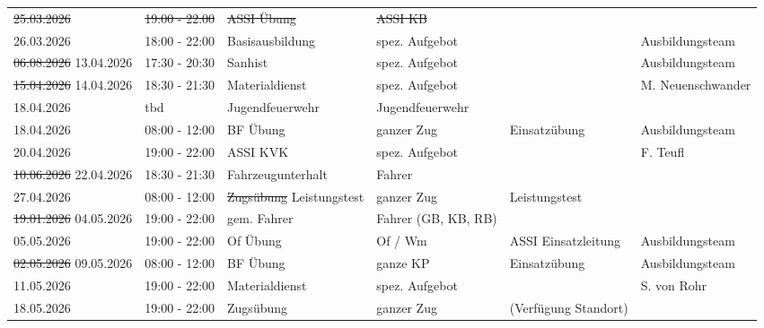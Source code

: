 \documentclass[11pt,a4paper]{article}
\begin{document}
\begin{adjustwidth}{1.5cm}{1.5cm}
\begin{longtable}{llllll}
\color{BrickRed}\sout{25.03.2026} & \color{BrickRed}\sout{19:00 - 22:00} & \color{BrickRed}\sout{ASSI \"Ubung} & \color{BrickRed}\sout{ASSI KB} & \color{BrickRed}\sout{} & \color{BrickRed}\sout{} \\
26.03.2026 & 18:00 - 22:00 & Basisausbildung & spez. Aufgebot & \color{OliveGreen} & \color{OliveGreen}Ausbildungsteam \\
\color{BrickRed}\sout{06.08.2026} \color{OliveGreen}13.04.2026 & 17:30 - 20:30 & Sanhist & spez. Aufgebot & \color{OliveGreen} & \color{OliveGreen}Ausbildungsteam \\
\color{BrickRed}\sout{15.04.2026} \color{OliveGreen}14.04.2026 & 18:30 - 21:30 & Materialdienst & spez. Aufgebot & \color{OliveGreen} & \color{OliveGreen}M. Neuenschwander \\
\color{OliveGreen}18.04.2026 & \color{OliveGreen}tbd & \color{OliveGreen}Jugendfeuerwehr & \color{OliveGreen}Jugendfeuerwehr & \color{OliveGreen} & \color{OliveGreen} \\
18.04.2026 & 08:00 - 12:00 & BF \"Ubung & ganzer Zug & \color{OliveGreen}Einsatz\"ubung & \color{OliveGreen}Ausbildungsteam \\
20.04.2026 & 19:00 - 22:00 & ASSI KVK & spez. Aufgebot & \color{OliveGreen} & \color{OliveGreen}F. Teufl \\
\color{BrickRed}\sout{10.06.2026} \color{OliveGreen}22.04.2026 & 18:30 - 21:30 & Fahrzeugunterhalt & Fahrer & \color{OliveGreen} & \color{OliveGreen} \\
27.04.2026 & 08:00 - 12:00 & \color{BrickRed}\sout{Zugs\"ubung} \color{OliveGreen}Leistungstest & ganzer Zug & \color{OliveGreen}Leistungstest & \color{OliveGreen} \\
\color{BrickRed}\sout{19.01.2026} \color{OliveGreen}04.05.2026 & 19:00 - 22:00 & gem. Fahrer & Fahrer (GB, KB, RB) & \color{OliveGreen} & \color{OliveGreen} \\
05.05.2026 & 19:00 - 22:00 & Of \"Ubung & Of / Wm & ASSI Einsatzleitung & \color{OliveGreen}Ausbildungsteam \\
\color{BrickRed}\sout{02.05.2026} \color{OliveGreen}09.05.2026 & 08:00 - 12:00 & BF \"Ubung & ganze KP & \color{OliveGreen}Einsatz\"ubung & \color{OliveGreen}Ausbildungsteam \\
11.05.2026 & 19:00 - 22:00 & Materialdienst & spez. Aufgebot & \color{OliveGreen} & \color{OliveGreen}S. von Rohr \\
18.05.2026 & 19:00 - 22:00 & Zugs\"ubung & ganzer Zug & \color{OliveGreen}(Verf\"ugung Standort) & \color{OliveGreen} \\

\end{longtable}
\end{adjustwidth}
\end{document}

